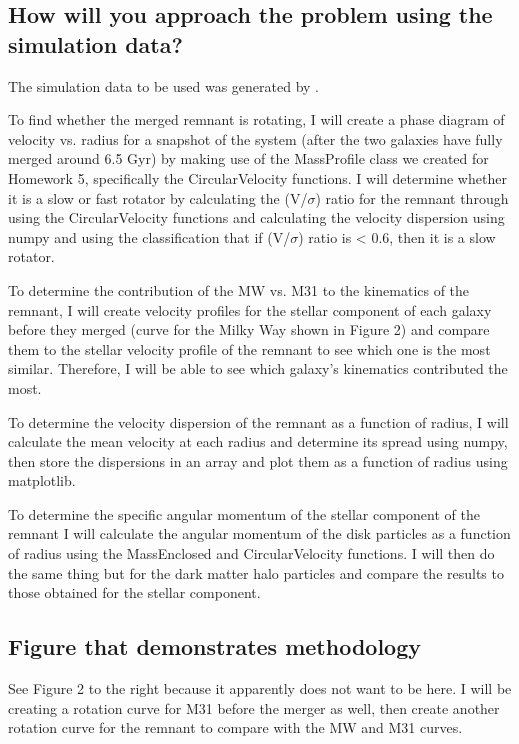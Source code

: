 \documentclass[twocolumn]{aastex63}
\begin{document}
\subsection{How will you approach the problem using the simulation data?}
The simulation data to be used was generated by \cite{2012ApJ...753....8V}. 

To find whether the merged remnant is rotating, I will create a phase diagram of velocity vs. radius for a snapshot of the system (after the two galaxies have fully merged around 6.5 Gyr) by making use of the MassProfile class we created for Homework 5, specifically the CircularVelocity functions.  I will determine whether it is a slow or fast rotator by calculating the (V/$\sigma$) ratio for the remnant through using the CircularVelocity functions and calculating the velocity dispersion using numpy and using the classification that if (V/$\sigma$) ratio is < 0.6, then it is a slow rotator.

To determine the contribution of the MW vs. M31 to the kinematics of the remnant, I will create velocity profiles for the stellar component of each galaxy before they merged (curve for the Milky Way shown in Figure 2) and compare them to the stellar velocity profile of the remnant to see which one is the most similar.  Therefore, I will be able to see which galaxy's kinematics contributed the most.  

To determine the velocity dispersion of the remnant as a function of radius, I will calculate the mean velocity at each radius and determine its spread using numpy, then store the dispersions in an array and plot them as a function of radius using matplotlib.  

To determine the specific angular momentum of the stellar component of the remnant I will calculate the angular momentum of the disk particles as a function of radius using the MassEnclosed and CircularVelocity functions.  I will then do the same thing but for the dark matter halo particles and compare the results to those obtained for the stellar component.  

\subsection{Figure that demonstrates methodology}

See Figure 2 to the right because it apparently does not want to be here.  I will be creating a rotation curve for M31 before the merger as well, then create another rotation curve for the remnant to compare with the MW and M31 curves.  
\end{document}
